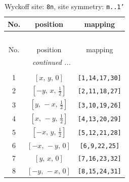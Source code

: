 \documentclass[fleqn,8pt]{jsarticle}
\begin{document}
\begin{longtable}{ccc}
\caption{Wyckoff site: {\tt 8n}, site symmetry: {\tt m..1'}}
 \\
 \hline \hline
No. & position & mapping \\ \hline \endfirsthead

\multicolumn{2}{l}{\tablename\ \thetable{}} \\
 \hline \hline
No. & position & mapping \\ \hline \endhead

 \hline \hline
\multicolumn{2}{r}{\footnotesize\it continued ...} \\ \endfoot

 \hline \hline
\multicolumn{2}{r}{} \\ \endlastfoot

1 & $\left[ x,\, y,\, 0 \right]$ & {\tt [1,14,17,30]} \\ \hline
2 & $\left[ - y,\, x,\, \frac{1}{2} \right]$ & {\tt [2,11,18,27]} \\ \hline
3 & $\left[ y,\, - x,\, \frac{1}{2} \right]$ & {\tt [3,10,19,26]} \\ \hline
4 & $\left[ x,\, - y,\, \frac{1}{2} \right]$ & {\tt [4,13,20,29]} \\ \hline
5 & $\left[ - x,\, y,\, \frac{1}{2} \right]$ & {\tt [5,12,21,28]} \\ \hline
6 & $\left[ - x,\, - y,\, 0 \right]$ & {\tt [6,9,22,25]} \\ \hline
7 & $\left[ y,\, x,\, 0 \right]$ & {\tt [7,16,23,32]} \\ \hline
8 & $\left[ - y,\, - x,\, 0 \right]$ & {\tt [8,15,24,31]} \\
\end{longtable}
\renewcommand{\arraystretch}{1.2}
\end{document}
